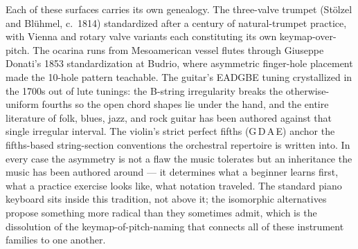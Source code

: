 \documentclass[10pt,letterpaper,twocolumn]{article}
\begin{document}
Each of these surfaces carries its own genealogy. The three-valve trumpet (Stölzel and Blühmel, c.\ 1814) standardized after a century of natural-trumpet practice, with Vienna and rotary valve variants each constituting its own keymap-over-pitch. The ocarina runs from Mesoamerican vessel flutes through Giuseppe Donati's 1853 standardization at Budrio, where asymmetric finger-hole placement made the 10-hole pattern teachable. The guitar's EADGBE tuning crystallized in the 1700s out of lute tunings: the B-string irregularity breaks the otherwise-uniform fourths so the open chord shapes lie under the hand, and the entire literature of folk, blues, jazz, and rock guitar has been authored against that single irregular interval. The violin's strict perfect fifths (G\,D\,A\,E) anchor the fifths-based string-section conventions the orchestral repertoire is written into. In every case the asymmetry is not a flaw the music tolerates but an inheritance the music has been authored around --- it determines what a beginner learns first, what a practice exercise looks like, what notation traveled. The standard piano keyboard sits inside this tradition, not above it; the isomorphic alternatives propose something more radical than they sometimes admit, which is the dissolution of the keymap-of-pitch-naming that connects all of these instrument families to one another.
\end{document}
